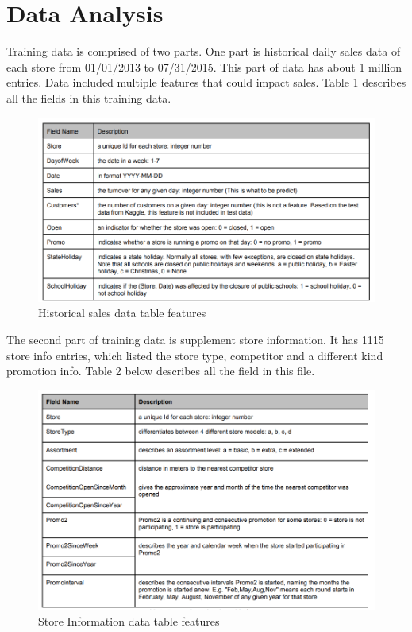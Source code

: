 \documentclass[12pt]{article}
\begin{document}
\section{Data Analysis}	

Training data is comprised of two parts. One part is historical daily sales data of each store from 01/01/2013
to 07/31/2015. This part of data has about 1 million entries. Data included multiple features that could impact
sales. Table 1 describes all the fields in this training data.

\begin{figure}[H]
        \centering
        \includegraphics[width=12cm]{image/t1.png}
        \caption{Historical sales data table features}
    \end{figure}


The second part of training data is supplement store information. It has 1115 store info entries, which listed
the store type, competitor and a different kind promotion info. Table 2 below describes all the field in this file.

\begin{figure}[H]
        \centering
       \includegraphics[width=12cm]{image/t2.png}
        \caption{Store Information data table features}
\end{figure}
\end{document}
